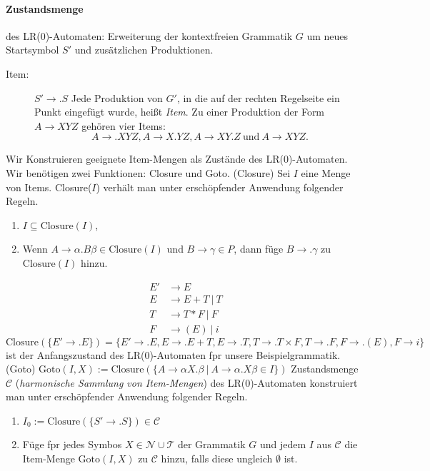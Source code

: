 \paragraph*{Zustandsmenge} des LR(0)-Automaten: Erweiterung der kontextfreien Grammatik $G$ um neues Startsymbol $S'$ und zusätzlichen Produktionen.
\begin{description}
 \item[Item:] $S' \to .S$
 \Defi Jede Produktion von $G'$, in die auf der rechten Regelseite ein Punkt eingefügt wurde, heißt \emph{Item}.
 \Bsp Zu einer Produktion der Form $A \to XYZ$ gehören vier Items:
     \[ A \to .XYZ, A \to X.YZ, A \to XY.Z\ \text{und}\ A \to XYZ. \]
\end{description}
Wir Konstruieren geeignete Item-Mengen als Zustände des LR(0)-Automaten. Wir benötigen zwei Funktionen: Closure und Goto.
\Defi (Closure) Sei $I$ eine Menge von Items. Closure($I$) verhält man unter erschöpfender Anwendung folgender Regeln.
\begin{enumerate}
 \item $I \subseteq \text{Closure}(I)$,
 \item Wenn $A \to \alpha.B\beta \in \text{Closure}(I)$ und $B \to \gamma \in P$, dann füge $B \to .\gamma$ zu $\text{Closure}(I)$ hinzu.
\end{enumerate}
\Bsp
\begin{align*}
 E' & \to E \\
 E  & \to E + T\ |\ T \\
 T  & \to T * F\ |\ F \\
 F  & \to ( E )\ |\ i
\end{align*}
$\text{Closure}(\{E' \to .E\}) = \{E' \to .E, E \to .E+T, E \to .T, T \to .T \times F, T \to .F, F \to .(E), F \to i\}$ ist der Anfangszustand des LR(0)-Automaten fpr unsere Beispielgrammatik.
\Defi (Goto) $\text{Goto}(I,X) := \text{Closure}(\{A \to \alpha X.\beta\ |\ A \to \alpha .X\beta \in I\})$
\Defi Zustandsmenge $\mathcal{C}$ (\emph{harmonische Sammlung von Item-Mengen}) des LR(0)-Automaten konstruiert man unter erschöpfender Anwendung folgender Regeln.
\begin{enumerate}
 \item $I_0 := \text{Closure}(\{S' \to .S\}) \in \mathcal{C}$
 \item Füge fpr jedes Symbos $X \in \mathcal{N} \cup \mathcal{T}$ der Grammatik $G$ und jedem $I$ aus $\mathcal{C}$ die Item-Menge $\text{Goto}(I,X)$ zu $\mathcal{C}$ hinzu, falls diese ungleich $\emptyset$ ist.
\end{enumerate}
